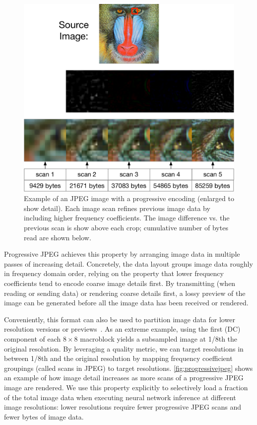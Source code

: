 \begin{figure}
    \centering
    \includegraphics[width=\textwidth]{e2e_diagrams/progressive jpeg example.pdf}
    \caption{Example of an JPEG image with a progressive encoding (enlarged to show detail). Each image scan refines previous image data by including higher frequency coefficients. The image difference vs. the previous scan is show above each crop; cumulative number of bytes read are shown below.}
    \label{fig:progressivejpeg}
\end{figure}
Progressive JPEG achieves this property by arranging image data in multiple passes of increasing detail.
Concretely, the data layout groups image data roughly in frequency domain order, relying on the property that lower frequency coefficients tend to encode coarse image details first.
By transmitting (when reading or sending data) or rendering coarse details first, a lossy preview of the image can be generated before all the image data has been received or rendered.


Conveniently, this format can also be used to partition image data for lower resolution versions or previews~\cite{yan2017customizing}.
As an extreme example, using the first (DC) component of each $8\times8$ macroblock yields a subsampled image at 1/8th the original resolution.
By leveraging a quality metric, we can target resolutions in between 1/8th and the original resolution by mapping frequency coefficient groupings (called scans in JPEG) to target resolutions.
\autoref{fig:progressivejpeg} shows an example of how image detail increases as more scans of a progressive JPEG image are rendered.
We use this property explicitly to selectively load a fraction of the total image data when executing neural network inference at different image resolutions: lower resolutions require fewer progressive JPEG scans and fewer bytes of image data.

